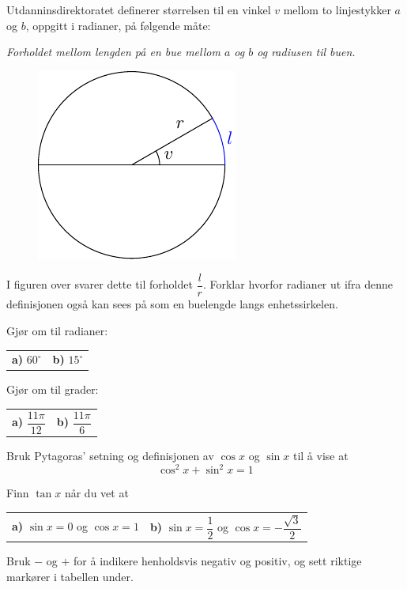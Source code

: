 



\eqlen
\opgt
\setcounter{section}{1}	
Utdanninsdirektoratet definerer størrelsen til en vinkel $ v $ mellom to linjestykker $ a $ og $ b $, oppgitt i radianer,  på følgende måte:\os

\textsl{Forholdet mellom lengden på en bue mellom $ a $ og $ b $ og radiusen til buen.}
\begin{figure}
	\centering
	\includegraphics[]{../../asymptote/rad}
\end{figure}
I figuren over svarer dette til forholdet $ \dfrac{l}{r} $.
\os
Forklar hvorfor radianer ut ifra denne definisjonen også kan sees på som en buelengde langs enhetssirkelen.

Gjør om til radianer:\os
\begin{tabular}{@{}l l}
	\textbf{a)} $ 60^\circ $ & \quad \textbf{b)} $ 15^\circ $
\end{tabular}

Gjør om til grader:\os

\begin{tabular}{@{}l l}
	\textbf{a)} $ \dfrac{11\pi}{12} $ & \quad \textbf{b)} $ \dfrac{11\pi}{6} $
\end{tabular}

\nes
{}
Bruk Pytagoras' setning og definisjonen av $ \cos x $ og $ \sin x $ til å vise at
\[ \cos^2 x + \sin^2 x = 1 \] 

Finn $\tan x $ når du vet at\\
\begin{tabular}{@{}l l}
	\textbf{a)} $ \sin x = 0$ og $ \cos x=1 $ & \quad \textbf{b)} $ \sin x = \dfrac{1}{2} $ og $ \cos x = -\dfrac{\sqrt{3}}{2} $
\end{tabular}
\newpage
{}
Bruk $ - $ og $ + $ for å indikere henholdsvis negativ og positiv, og sett riktige markører i tabellen under.\os

